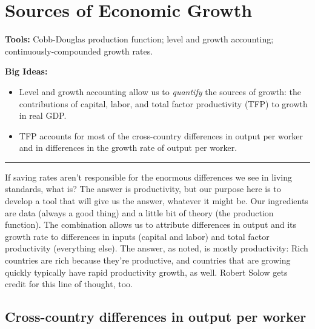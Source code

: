 \chapter{Sources of Economic Growth}\label{chp:grth}
\hypertarget{growth}{}

\textbf{Tools:} Cobb-Douglas production function; level and growth accounting;
continuously-compounded growth rates.

\textbf{Big Ideas:}
\vspace{-0.1in}
\begin{itemize}
\item Level and growth accounting allow us to \emph{quantify} the sources of growth:
  the contributions of capital, labor, and total factor productivity (TFP) to growth in real GDP.
\item TFP accounts for most of the cross-country differences in output per worker
and in differences in the growth rate of output per worker.
\end{itemize}
\rule{\textwidth}{1pt}

If saving rates aren't responsible for
the enormous differences we see in living standards, what is?
The answer is productivity, but our purpose here is to develop
a tool that will give us the answer, whatever it might be.
Our ingredients are data (always a good thing)
and a little bit of theory (the production function).
The combination allows us to attribute differences in output and its
growth rate to differences in inputs (capital and labor)
and total factor productivity (everything else).
The answer, as noted, is mostly productivity:
Rich countries are rich because they're productive,
and countries that are growing quickly typically
have rapid productivity growth, as well.
Robert Solow gets credit for this line of thought, too.


\section{Cross-country differences in output per worker}


